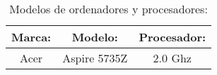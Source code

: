 \begin{table}[!ht]
\begin{center}
		\begin{tabular}{|c||c|c|}
          \hline
          Marca: & Modelo: & Procesador: \\ \hline
          Acer & Aspire 5735Z & 2.0 Ghz \\ \hline
        \end{tabular}
\end{center}
        \caption{Modelos de ordenadores y procesadores:}
        \label{marca:1}
\end{table}
        
